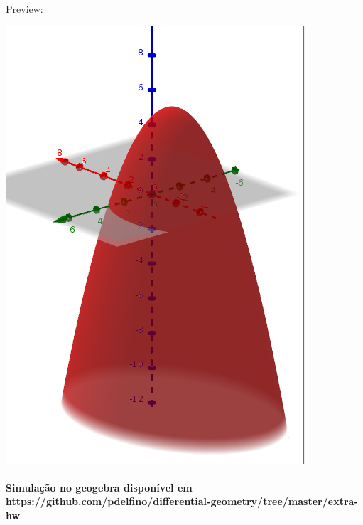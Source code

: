 \documentclass[fleqn]{article}
\begin{document}
Preview:
\bigskip

\includegraphics[scale=0.2]{surface}  

\bigskip

\paragraph{Simulação no geogebra disponível em https://github.com/pdelfino/differential-geometry/tree/master/extra-hw}
\end{document}
